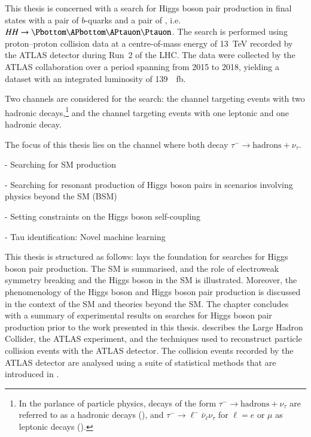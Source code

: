 This thesis is concerned with a search for Higgs boson pair production in final
states with a pair of $b$-quarks and a pair of \tauleptons, i.e.\
$HH \to \bbtautau$. The search is performed using proton--proton collision data
at a centre-of-mass energy of \SI{13}{\TeV} recorded by the ATLAS detector
during Run~2 of the LHC. The data were collected by the ATLAS collaboration over
a period spanning from 2015 to 2018, yielding a dataset with an integrated
luminosity of \SI{139}{\per\femto\barn}.

Two channels are considered for the search: the \hadhad channel targeting events
with two hadronic \taulepton decays,\footnote{In the parlance of particle
  physics, decays of the form $\tau^- \to \text{hadrons} + \nu_\tau$ are
  referred to as a hadronic \taulepton decays (\tauhad), and
  $\tau^- \to \ell^- \bar{\nu}_\ell \nu_\tau$ for $\ell = e$ or $\mu$ as
  leptonic \taulepton decays (\taulep).} and the \lephad channel targeting
events with one leptonic and one hadronic \taulepton decay.




The focus of this thesis lies on the channel where both \tauleptons decay
$\tau^- \to \text{hadrons} + \nu_\tau$.

- Searching for SM \HH production

- Searching for resonant production of Higgs boson pairs in scenarios involving
physics beyond the SM (BSM)

- Setting constraints on the Higgs boson self-coupling


- Tau identification: Novel machine learning



\vspace{5em}

This thesis is structured as follows:  lays the
foundation for searches for Higgs boson pair production. The SM is summarised,
and the role of electroweak symmetry breaking and the Higgs boson in the SM is
illustrated. Moreover, the phenomenology of the Higgs boson and Higgs boson pair
production is discussed in the context of the SM and theories beyond the SM. The
chapter concludes with a summary of experimental results on searches for Higgs
boson pair production prior to the work presented in this thesis.
\Cref{sec:atlas_and_lhc} describes the Large Hadron Collider, the ATLAS
experiment, and the techniques used to reconstruct particle collision events
with the ATLAS detector. The collision events recorded by the ATLAS detector are
analysed using a suite of statistical methods that are introduced in
\Cref{sec:experimental_methods}.

